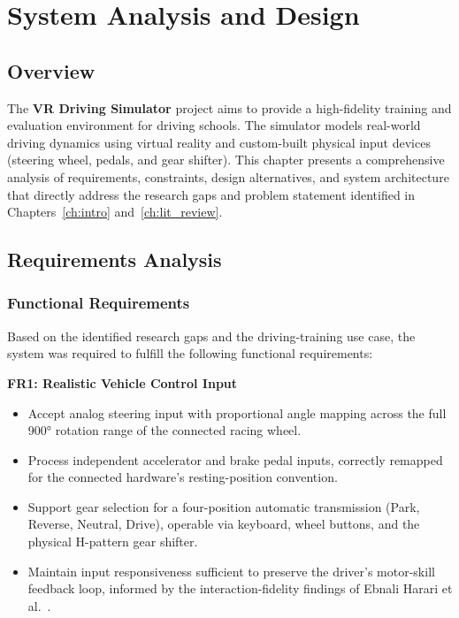 \chapter{System Analysis and Design}
\label{ch:system_analysis}

\section{Overview}
The \textbf{VR Driving Simulator} project aims to provide a high-fidelity training and evaluation environment for driving schools. 
The simulator models real-world driving dynamics using virtual reality and custom-built physical input devices (steering wheel, pedals, and gear shifter). 
This chapter presents a comprehensive analysis of requirements, constraints, design alternatives, and system architecture that directly address the research gaps and problem statement identified in Chapters~\ref{ch:intro} and~\ref{ch:lit_review}.

\section{Requirements Analysis}

\subsection{Functional Requirements}
Based on the identified research gaps and the driving-training use case, the system was required to fulfill the following functional requirements:

\textbf{FR1: Realistic Vehicle Control Input}
\begin{itemize}
    \item Accept analog steering input with proportional angle mapping across the full 900° rotation range of the connected racing wheel.
    \item Process independent accelerator and brake pedal inputs, correctly remapped for the connected hardware's resting-position convention.
    \item Support gear selection for a four-position automatic transmission (Park, Reverse, Neutral, Drive), operable via keyboard, wheel buttons, and the physical H-pattern gear shifter.
    \item Maintain input responsiveness sufficient to preserve the driver's motor-skill feedback loop, informed by the interaction-fidelity findings of Ebnali Harari et al.~\cite{Harari2021}.
\end{itemize}

